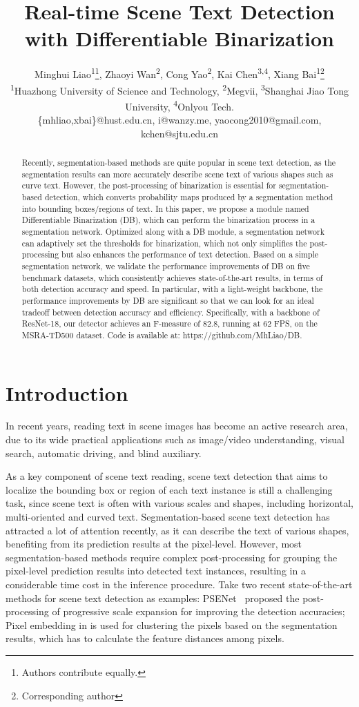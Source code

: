 \documentclass[letterpaper]{article} %
\title{Real-time Scene Text Detection with Differentiable Binarization}
\author{
Minghui Liao\textsuperscript{\rm 1}\thanks{Authors contribute equally.},
Zhaoyi Wan\textsuperscript{\rm 2}\footnotemark[\value{footnote}],
Cong Yao\textsuperscript{\rm 2},
Kai Chen\textsuperscript{\rm 3,4},
Xiang Bai\textsuperscript{\rm 1}\thanks{Corresponding author}\\
\textsuperscript{\rm 1}Huazhong University of Science and Technology,
\textsuperscript{\rm 2}Megvii,
\textsuperscript{\rm 3}Shanghai Jiao Tong University,
\textsuperscript{\rm 4}Onlyou Tech.\\
\{mhliao,xbai\}@hust.edu.cn, i@wanzy.me, yaocong2010@gmail.com, kchen@sjtu.edu.cn
}
\begin{document}
\maketitle

\begin{abstract}
Recently, segmentation-based methods are quite popular in scene text detection, as the segmentation results can more accurately describe scene text of various shapes such as curve text. However, the post-processing of binarization is essential for segmentation-based detection, which converts probability maps produced by a segmentation method into bounding boxes/regions of text. 
In this paper, we propose a module named Differentiable Binarization (DB), which can perform the binarization process in a segmentation network. Optimized along with a DB module, a segmentation network can adaptively set the thresholds for binarization, which not only simplifies the post-processing but also enhances the performance of text detection. Based on a simple segmentation network, we validate the performance improvements of DB on five benchmark datasets, which consistently achieves state-of-the-art results, in terms of both detection accuracy and speed.
In particular, with a light-weight backbone, the performance improvements by DB are significant so that we can look for an ideal tradeoff between detection accuracy and efficiency.
Specifically, with a backbone of ResNet-18, our detector achieves an F-measure of 82.8, running at 62 FPS, on the MSRA-TD500 dataset. Code is available at: https://github.com/MhLiao/DB.
\end{abstract}

\section{Introduction}

In recent years, reading text in scene images has become an active research area, due to its wide practical applications such as image/video understanding, visual search, automatic driving, and blind auxiliary. 

As a key component of scene text reading, scene text detection that aims to localize the bounding box or region of each text instance is still a challenging task, since scene text is often with various scales and shapes, including horizontal, multi-oriented and curved text. Segmentation-based scene text detection has attracted a lot of attention recently, as it can describe the text of various shapes, benefiting from its prediction results at the pixel-level. However, most segmentation-based methods require complex post-processing for grouping the pixel-level prediction results into detected text instances, resulting in a considerable time cost in the inference procedure. Take two recent state-of-the-art methods for scene text detection as examples: PSENet~\cite{wang2019shape} proposed the post-processing of progressive scale expansion for improving the detection accuracies; Pixel embedding in \cite{tian2019learning} is used for clustering the pixels based on the segmentation results, which has to calculate the feature distances among pixels.   
\end{document}
